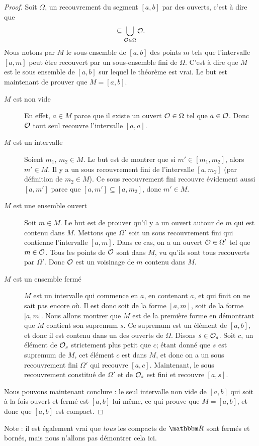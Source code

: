 \begin{proof}
	Soit $\Omega$, un recouvrement du segment $[a,b]$ par des ouverts, c'est à dire que
	\begin{equation}
		[a,b]\subseteq\bigcup_{\mO\in\Omega}\mO.
	\end{equation}
	Nous notons par $M$ le sous-ensemble de $[a,b]$ des points $m$ tels que l'intervalle $[a,m]$ peut être recouvert par un sous-ensemble fini de $\Omega$. C'est à dire que $M$ est le sous ensemble de $[a,b]$ sur lequel le théorème est vrai. Le but est maintenant de prouver que $M=[a,b]$.
	\begin{description}
		\item[$M$ est non vide] En effet, $a\in M$ parce que il existe un ouvert $\mathcal{O}\in\Omega$ tel que $a\in\mathcal{O}$. Donc $\mathcal{O}$ tout seul recouvre l'intervalle $[a,a]$. 
		\item[$M$ est un intervalle] Soient $m_1$, $m_2\in M$. Le but est de montrer que si $m'\in[m_1,m_2]$, alors $m'\in M$. Il y a un sous recouvrement fini de l'intervalle $[a,m_2]$ (par définition de $m_2\in M$). Ce sous recouvrement fini recouvre évidement aussi $[a,m']$ parce que $[a,m']\subseteq [a,m_2]$, donc $m'\in M$.
		\item[$M$ est une ensemble ouvert] Soit $m\in M$. Le but est de prouver qu'il y a un ouvert autour de $m$ qui est contenu dans $M$. Mettons que $\Omega'$ soit un sous recouvrement fini qui contienne l'intervalle $[a,m]$. Dans ce cas, on a un ouvert $\mathcal{O}\in\Omega'$ tel que $m\in\mathcal{O}$. Tous les points de $\mathcal{O}$ sont dans $M$, vu qu'ils sont tous recouverts par $\Omega'$. Donc $\mathcal{O}$ est un voisinage de $m$ contenu dans $M$.
		\item[$M$ est un ensemble fermé] $M$ est un intervalle qui commence en $a$, en contenant $a$, et qui finit on ne sait pas encore où. Il est donc soit de la forme $[a,m]$, soit de la forme $[a,m[$. Nous allons montrer que $M$ est de la première forme en démontrant que $M$ contient son supremum $s$. Ce supremum est un élément de $[a,b]$, et donc il est contenu dans un des ouverts de $\Omega$. Disons $s\in\mathcal{O}_s$. Soit $c$, un élément de $\mathcal{O}_s$ strictement plus petit que $c$; étant donné que $s$ est supremum de $M$, cet élément $c$ est dans $M$, et donc on a un sous recouvrement fini $\Omega'$ qui recouvre $[a,c]$. Maintenant, le sous recouvrement constitué de $\Omega'$ et de $\mathcal{O}_s$ est fini et recouvre $[a,s]$.
	\end{description}
	Nous pouvons maintenant conclure : le seul intervalle non vide de $[a,b]$ qui soit à la fois ouvert et fermé est $[a,b]$ lui-même, ce qui prouve que $M=[a,b]$, et donc que $[a,b]$ est compact.
\end{proof}
Note : il est également vrai que \emph{tous} les compacts de $\eR$ sont fermés et bornés, mais nous n'allons pas démontrer cela ici.

